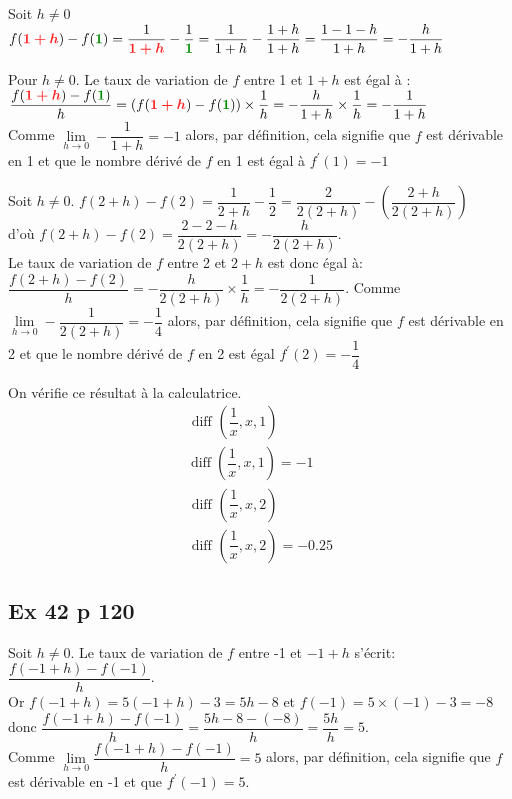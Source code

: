 \documentclass[12pt,a5paper]{book}
\begin{document}
\begin{enumMet}
\item \begin{enumMet}
    \item Soit $h \neq 0$ $f(\mRouge{1+h})-f(\mVert{1})=\dfrac{1}{\mRouge{1+h}}-\dfrac{1}{\mVert{1}}=\dfrac{1}{1+h}-\dfrac{1+h}{1+h}=\dfrac{1-1-h}{1+h}=-\dfrac{h}{1+h}$
    \item Pour $h \neq 0$. Le taux de variation de $f$ entre 1 et $1+h$ est égal à :\\
    $\dfrac{f(\mRouge{1+h})-f(\mVert{1})}{h}=(f(\mRouge{1+h})-f(\mVert{1})) \times \dfrac{1}{h}=-\dfrac{h}{1+h} \times \dfrac{1}{h}=-\dfrac{1}{1+h}$\\
    Comme $\lim\limits_{h \rightarrow 0} -\dfrac{1}{1+h}=-1$ alors, par définition, cela signifie que $f$ est dérivable en 1 et que le nombre dérivé de $f$ en 1 est égal à $f^{\prime}(1)=-1$
\end{enumMet}
\item Soit $h \neq 0$. $f(2+h)-f(2)=\dfrac{1}{2+h}-\dfrac{1}{2}=\dfrac{2}{2(2+h)}-\left(\dfrac{2+h}{2(2+h)}\right)$\\ d'où
$f(2+h)-f(2)=\dfrac{2-2-h}{2(2+h)}=-\dfrac{h}{2(2+h)}$.\\
Le taux de variation de $f$ entre 2 et $2+h$ est donc égal à:\\ $\dfrac{f(2+h)-f(2)}{h}=-\dfrac{h}{2(2+h)} \times \dfrac{1}{h}=-\dfrac{1}{2(2+h)}$. Comme $\lim\limits_{h \rightarrow 0} -\dfrac{1}{2(2+h)}=-\dfrac{1}{4}$ alors, par définition, cela signifie que $f$ est
dérivable en 2 et que le nombre dérivé de $f$ en 2 est égal $f^{\prime}(2)=-\dfrac{1}{4}$
\item On vérifie ce résultat à la calculatrice.
$$
\begin{array}{c}
\text { diff }\left(\dfrac{1}{x}, x, 1\right)\\
\operatorname{diff}\left(\dfrac{1}{x}, x, 1\right) =-1 \\
\text { diff }\left(\dfrac{1}{x}, x, 2\right) \\
\text { diff }\left(\dfrac{1}{x}, x, 2\right) =-0.25
\end{array}
$$
\end{enumMet}

\subsection*{Ex 42 p 120}

Soit $h \neq 0$. Le taux de variation de $f$ entre -1 et $-1+h$ s'écrit: $\dfrac{f(-1+h)-f(-1)}{h}$.\\
Or $f(-1+h)=5(-1+h)-3=5 h-8$ et $f(-1)=5 \times(-1)-3=-8$\\
donc $\dfrac{f(-1+h)-f(-1)}{h}=\dfrac{5 h-8-(-8)}{h}=\dfrac{5 h}{h}=5$. \\
Comme $\lim\limits_{h \rightarrow 0} \dfrac{f(-1+h)-f(-1)}{h}=5$ alors, par définition, cela signifie que $f$ est dérivable en -1 et que $f^{\prime}(-1)=5$.
\end{document}
